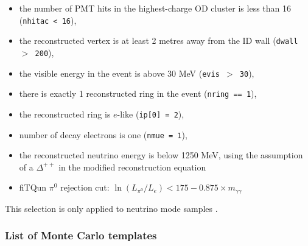 \begin{itemize}
\item
the number of PMT hits in the highest-charge OD cluster is less than 16
({\tt nhitac < 16}),
\item
the reconstructed vertex is at least 2 metres away from the ID wall 
({\tt dwall $>$ 200}),
\item
the visible energy in the event is above 30 MeV 
({\tt evis  $>$ 30}),
\item
there is exactly 1 reconstructed ring in the event 
({\tt nring == 1}),
\item
the reconstructed ring is $e$-like 
({\tt ip[0] = 2}),
\item
number of decay electrons is one
({\tt nmue = 1}),
\item
the reconstructed neutrino energy is below 1250 MeV, using the assumption of a \( \Delta^{++} \) in the modified reconstruction equation  
\item
fiTQun $\pi^0$ rejection cut: $\ln (L_{\pi^0} / L_e ) < 175 - 0.875 \times m_{\gamma \gamma} $
\end{itemize}

This selection is only applied to neutrino mode samples \cite{Superk_run7}.



\subsubsection {List of Monte Carlo templates}
\label{sec:mc_templates:template_list}

